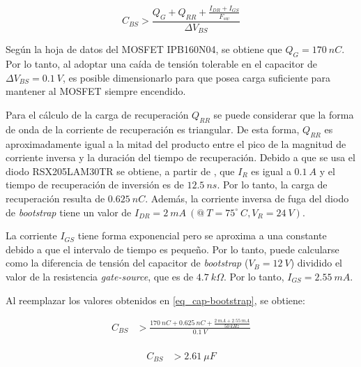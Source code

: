 \begin{equation} \label{eq_cap-bootstrap}
	C_{BS} > \frac{Q_G+Q_{RR} + \frac{I_{DR}+I_{GS}}{F_{sw}}}{\Delta V_{BS}}
\end{equation}

\noindent Según la hoja de datos \cite{IPB160N04} del MOSFET IPB160N04, se obtiene que $Q_G= 170\:nC$. Por lo tanto, al adoptar una caída de tensión tolerable en el capacitor de $\Delta V_{BS} = 0.1\:V$, es posible dimensionarlo para que posea carga suficiente para mantener al MOSFET siempre encendido.

\noindent Para el cálculo de la carga de recuperación $Q_{RR}$ se puede considerar que la forma de onda de la corriente de recuperación es triangular. De esta forma,  $Q_{RR}$ es aproximadamente igual a la mitad del producto entre el pico de la magnitud de corriente inversa y la duración del tiempo de recuperación.  Debido a que se usa el diodo RSX205LAM30TR se obtiene, a partir de \cite{RSX205LAM30}, que  $I_R$ es igual a $0.1\:A$  y  el tiempo de recuperación de inversión es de $12.5\:ns$. Por lo tanto, la carga de recuperación resulta de $0.625\:nC$. Además, la corriente inversa de fuga del diodo de \textsl{bootstrap} tiene un valor de $I_{DR} =2 \:mA\:(@\: T=75^{\circ}\:C, V_R= 24\:V)$.

\noindent La corriente $I_{GS}$ tiene forma exponencial pero se aproxima a una constante debido a que el intervalo de tiempo es pequeño. Por lo tanto, puede calcularse como la diferencia de tensión del capacitor de \textsl{bootstrap} ($V_B=12\:V$) dividido el valor de la resistencia \textsl{gate-source}, que es de $4.7\:k\Omega$. Por lo tanto, $I_{GS}=2.55 \:mA$. 


\noindent Al reemplazar los valores obtenidos en \ref{eq_cap-bootstrap}, se obtiene:

\begin{equation} 
	\begin{aligned}
		C_{BS} &> \frac{170 \:nC + 0.625\:nC + \frac{2 \:mA + 2.55 \:mA}{50 \:kHz}}{0.1 \:V}\\
	\end{aligned}
\end{equation}

\begin{equation} 
	\begin{aligned}
		C_{BS} &> 2.61 \:\mu F\\	
	\end{aligned}
\end{equation}


